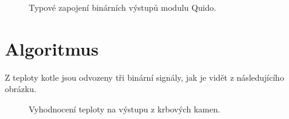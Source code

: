 \documentclass{book}
\begin{document}
        \begin{figure}\centering
            \begin{tikzpicture}
                
            \end{tikzpicture}
            \caption{Typové zapojení binárních výstupů modulu Quido.}
            \label{fig:binary-out}
        \end{figure}

    \chapter{Algoritmus}

        Z teploty kotle jsou odvozeny tři binární signály, jak je vidět z
        následujícího obrázku.

        \begin{figure}
            \begin{tikzpicture}
                
            \end{tikzpicture}
            \caption{Vyhodnocení teploty na výstupu z krbových kamen.}
        \end{figure}


    \printindex
\end{document}

